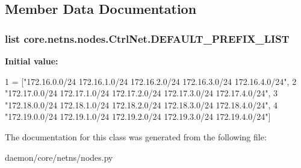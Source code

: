 \subsection{Member Data Documentation}
\hypertarget{classcore_1_1netns_1_1nodes_1_1_ctrl_net_a6b4d2d9c456b21988cb712b8b6c7dd24}{
\subsubsection[{D\+E\+F\+A\+U\+L\+T\+\_\+\+P\+R\+E\+F\+I\+X\+\_\+\+L\+I\+S\+T}]{\setlength{\rightskip}{0pt plus 5cm}list core.\+netns.\+nodes.\+Ctrl\+Net.\+D\+E\+F\+A\+U\+L\+T\+\_\+\+P\+R\+E\+F\+I\+X\+\_\+\+L\+I\+S\+T\hspace{0.3cm}{\ttfamily [static]}}}\label{classcore_1_1netns_1_1nodes_1_1_ctrl_net_a6b4d2d9c456b21988cb712b8b6c7dd24}
{\bfseries Initial value\+:}
\begin{DoxyCode}
1 = [\textcolor{stringliteral}{"172.16.0.0/24 172.16.1.0/24 172.16.2.0/24 172.16.3.0/24 172.16.4.0/24"},
2                            \textcolor{stringliteral}{"172.17.0.0/24 172.17.1.0/24 172.17.2.0/24 172.17.3.0/24 172.17.4.0/24"},
3                            \textcolor{stringliteral}{"172.18.0.0/24 172.18.1.0/24 172.18.2.0/24 172.18.3.0/24 172.18.4.0/24"},
4                            \textcolor{stringliteral}{"172.19.0.0/24 172.19.1.0/24 172.19.2.0/24 172.19.3.0/24 172.19.4.0/24"}]
\end{DoxyCode}


The documentation for this class was generated from the following file\+:\begin{DoxyCompactItemize}
\item 
daemon/core/netns/nodes.\+py\end{DoxyCompactItemize}
